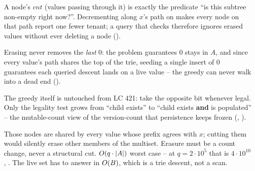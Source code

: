 \begin{observation}
A node's $\mathit{cnt}$ (values passing through it) is exactly the predicate ``is this subtree non-empty
right now?''. Decrementing along $x$'s path on  makes every node on that path report one fewer
tenant; a query that checks  therefore ignores erased values without ever
deleting a node ().
\end{observation}
\begin{observation}
Erasing never removes the \emph{last} $0$: the problem guarantees $0$ stays in $A$, and since every value's
path shares the top of the trie, seeding a single insert of $0$ guarantees each queried descent lands on a
live value -- the greedy can never walk into a dead end ().
\end{observation}
\begin{observation}
The greedy itself is untouched from LC 421: take the opposite bit whenever legal. Only the legality test
grows from ``child exists'' to ``child exists \textbf{and} is populated'' -- the mutable-count view of the
version-count that persistence keeps frozen (, ).
\end{observation}

\begin{thinkbox}
{Those nodes are shared by every value whose prefix agrees with $x$; cutting them would silently erase other
members of the multiset. Erasure must be a count change, never a structural cut.}
{$O(q\cdot|A|)$ worst case -- at $q=2\cdot10^{5}$ that is $4\cdot10^{10}$, \tle. The live set has to
answer in $O(B)$, which is a trie descent, not a scan.}
\end{thinkbox}

